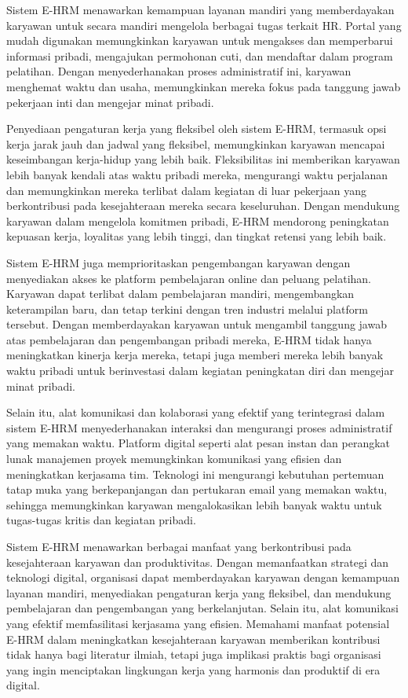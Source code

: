 \documentclass[12pt]{article}
\begin{document}
Sistem E-HRM menawarkan kemampuan layanan mandiri yang memberdayakan karyawan untuk secara mandiri mengelola berbagai tugas terkait HR. Portal yang mudah digunakan memungkinkan karyawan untuk mengakses dan memperbarui informasi pribadi, mengajukan permohonan cuti, dan mendaftar dalam program pelatihan. Dengan menyederhanakan proses administratif ini, karyawan menghemat waktu dan usaha, memungkinkan mereka fokus pada tanggung jawab pekerjaan inti dan mengejar minat pribadi.

Penyediaan pengaturan kerja yang fleksibel oleh sistem E-HRM, termasuk opsi kerja jarak jauh dan jadwal yang fleksibel, memungkinkan karyawan mencapai keseimbangan kerja-hidup yang lebih baik. Fleksibilitas ini memberikan karyawan lebih banyak kendali atas waktu pribadi mereka, mengurangi waktu perjalanan dan memungkinkan mereka terlibat dalam kegiatan di luar pekerjaan yang berkontribusi pada kesejahteraan mereka secara keseluruhan. Dengan mendukung karyawan dalam mengelola komitmen pribadi, E-HRM mendorong peningkatan kepuasan kerja, loyalitas yang lebih tinggi, dan tingkat retensi yang lebih baik.

Sistem E-HRM juga memprioritaskan pengembangan karyawan dengan menyediakan akses ke platform pembelajaran online dan peluang pelatihan. Karyawan dapat terlibat dalam pembelajaran mandiri, mengembangkan keterampilan baru, dan tetap terkini dengan tren industri melalui platform tersebut. Dengan memberdayakan karyawan untuk mengambil tanggung jawab atas pembelajaran dan pengembangan pribadi mereka, E-HRM tidak hanya meningkatkan kinerja kerja mereka, tetapi juga memberi mereka lebih banyak waktu pribadi untuk berinvestasi dalam kegiatan peningkatan diri dan mengejar minat pribadi.

Selain itu, alat komunikasi dan kolaborasi yang efektif yang terintegrasi dalam sistem E-HRM menyederhanakan interaksi dan mengurangi proses administratif yang memakan waktu. Platform digital seperti alat pesan instan dan perangkat lunak manajemen proyek memungkinkan komunikasi yang efisien dan meningkatkan kerjasama tim. Teknologi ini mengurangi kebutuhan pertemuan tatap muka yang berkepanjangan dan pertukaran email yang memakan waktu, sehingga memungkinkan karyawan mengalokasikan lebih banyak waktu untuk tugas-tugas kritis dan kegiatan pribadi.

Sistem E-HRM menawarkan berbagai manfaat yang berkontribusi pada kesejahteraan karyawan dan produktivitas. Dengan memanfaatkan strategi dan teknologi digital, organisasi dapat memberdayakan karyawan dengan kemampuan layanan mandiri, menyediakan pengaturan kerja yang fleksibel, dan mendukung pembelajaran dan pengembangan yang berkelanjutan. Selain itu, alat komunikasi yang efektif memfasilitasi kerjasama yang efisien. Memahami manfaat potensial E-HRM dalam meningkatkan kesejahteraan karyawan memberikan kontribusi tidak hanya bagi literatur ilmiah, tetapi juga implikasi praktis bagi organisasi yang ingin menciptakan lingkungan kerja yang harmonis dan produktif di era digital.   
\end{document}
